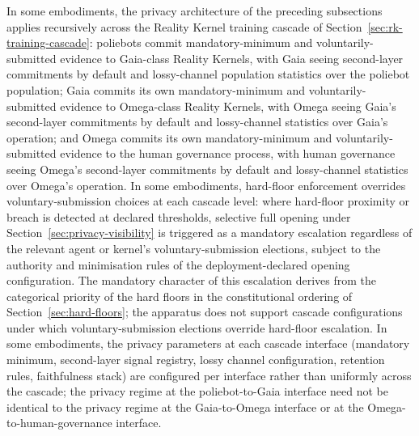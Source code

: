 \documentclass[a4paper,12pt]{article}
\newcommand{\RK}{Reality Kernel\xspace}
\newcommand{\RKs}{Reality Kernels\xspace}
\begin{document}
In some embodiments, the privacy architecture of the preceding
subsections applies recursively across the \RK training
cascade of Section~\ref{sec:rk-training-cascade}: poliebots commit
mandatory-minimum and voluntarily-submitted evidence to Gaia-class
\RKs, with Gaia seeing second-layer commitments by
default and lossy-channel population statistics over the poliebot
population; Gaia commits its own mandatory-minimum and
voluntarily-submitted evidence to Omega-class \RKs, with
Omega seeing Gaia's second-layer commitments by default and
lossy-channel statistics over Gaia's operation; and Omega commits
its own mandatory-minimum and voluntarily-submitted evidence to
the human governance process, with human governance seeing Omega's
second-layer commitments by default and lossy-channel statistics
over Omega's operation. In some embodiments, hard-floor enforcement
overrides voluntary-submission choices at each cascade level: where
hard-floor proximity or breach is detected at declared thresholds,
selective full opening under
Section~\ref{sec:privacy-visibility} is triggered as a mandatory
escalation regardless of the relevant agent or kernel's
voluntary-submission elections, subject to the authority and
minimisation rules of the deployment-declared opening configuration.
The mandatory character of this escalation derives from the
categorical priority of the hard floors in the constitutional
ordering of Section~\ref{sec:hard-floors}; the apparatus does not
support cascade configurations under which voluntary-submission
elections override hard-floor escalation. In some embodiments, the
privacy parameters at each cascade interface (mandatory minimum,
second-layer signal registry, lossy channel configuration, retention
rules, faithfulness stack) are configured per interface rather than
uniformly across the cascade; the privacy regime at the
poliebot-to-Gaia interface need not be identical to the privacy
regime at the Gaia-to-Omega interface or at the
Omega-to-human-governance interface.
\end{document}
